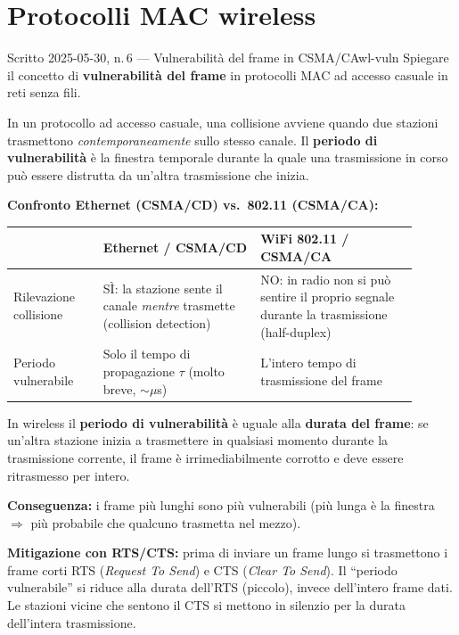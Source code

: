 \documentclass{report}
\begin{document}
\section{Protocolli MAC wireless}

\begin{Exercise}{Scritto 2025-05-30, n.\,6 --- Vulnerabilità del frame in CSMA/CA}{wl-vuln}
Spiegare il concetto di \textbf{vulnerabilità del frame} in protocolli MAC ad
accesso casuale in reti senza fili.
\end{Exercise}

\begin{solution}
In un protocollo ad accesso casuale, una collisione avviene quando due stazioni
trasmettono \emph{contemporaneamente} sullo stesso canale. Il \textbf{periodo di
vulnerabilità} è la finestra temporale durante la quale una trasmissione in corso
può essere distrutta da un'altra trasmissione che inizia.

\medskip
\textbf{Confronto Ethernet (CSMA/CD) vs.\ 802.11 (CSMA/CA):}

\begin{center}
\begin{tabular}{p{0.2\linewidth}p{0.35\linewidth}p{0.35\linewidth}}
\hline
 & \textbf{Ethernet / CSMA/CD} & \textbf{WiFi 802.11 / CSMA/CA} \\
\hline
Rilevazione collisione & SÌ: la stazione sente il canale \emph{mentre} trasmette
  (collision detection) & NO: in radio non si può sentire il proprio segnale
  durante la trasmissione (half-duplex) \\
Periodo vulnerabile & Solo il tempo di propagazione $\tau$
  (molto breve, $\sim\mu$s) & L'intero tempo di trasmissione del frame \\
\hline
\end{tabular}
\end{center}

\medskip
In wireless il \textbf{periodo di vulnerabilità} è uguale alla
\textbf{durata del frame}: se un'altra stazione inizia a trasmettere
in qualsiasi momento durante la trasmissione corrente, il frame è
irrimediabilmente corrotto e deve essere ritrasmesso per intero.

\medskip
\textbf{Conseguenza:} i frame più lunghi sono più vulnerabili (più lunga è la
finestra $\Rightarrow$ più probabile che qualcuno trasmetta nel mezzo).

\medskip
\textbf{Mitigazione con RTS/CTS:} prima di inviare un frame lungo si trasmettono
i frame corti RTS (\emph{Request To Send}) e CTS (\emph{Clear To Send}).
Il ``periodo vulnerabile'' si riduce alla durata dell'RTS (piccolo), invece
dell'intero frame dati. Le stazioni vicine che sentono il CTS si mettono in
silenzio per la durata dell'intera trasmissione.
\end{solution}
\end{document}
